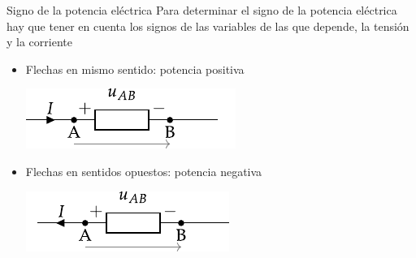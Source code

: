 \documentclass[aspectratio=169, xcolor={usenames,svgnames,dvipsnames}]{beamer}
\begin{document}
\begin{frame}{Signo de la potencia eléctrica}
    Para determinar el \alert{signo de la potencia eléctrica} hay que tener en cuenta los signos de las variables de las que depende, la tensión y la corriente
    \vspace{5mm}
    \begin{itemize}
        \item Flechas en \alert{mismo sentido}: potencia \alert{positiva} %

        \vspace{2mm}        
        \begin{center}
            \includegraphics[height=0.17\textheight]{../figs/signo_potencia1.pdf}            
        \end{center}
    
    \vspace{5mm}
        \item Flechas en \alert{sentidos opuestos}: potencia \alert{negativa} %

        \vspace{2mm}  
        \begin{center}
            \hspace*{-7mm}
            \includegraphics[height=0.17\textheight]{../figs/signo_potencia2.pdf}
        \end{center}
    \end{itemize}
\end{frame}
\end{document}
